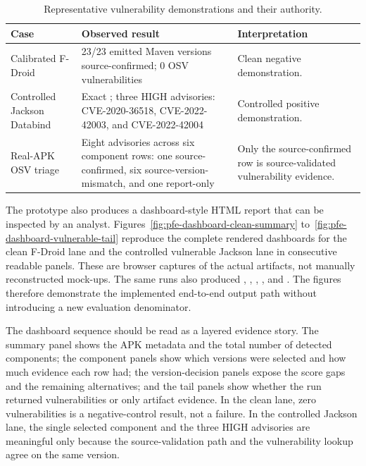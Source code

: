 \begin{table}[H]
\centering
\caption{Representative vulnerability demonstrations and their authority.}
\label{tab:pfe-vulnerability-demo}
\begin{tabularx}{\textwidth}{L{0.28\textwidth}L{0.26\textwidth}X}
\toprule
\textbf{Case} & \textbf{Observed result} & \textbf{Interpretation}\\
\midrule
Calibrated F-Droid & 23/23 emitted Maven versions source-confirmed; 0 OSV
vulnerabilities & Clean negative demonstration.\\
Controlled Jackson Databind & Exact
; three HIGH advisories:
CVE-2020-36518, CVE-2022-42003, and CVE-2022-42004 &
Controlled positive demonstration.\\
Real-APK OSV triage & Eight advisories across six component rows: one
source-confirmed, six source-version-mismatch, and one report-only &
Only the source-confirmed row is source-validated vulnerability evidence.\\
\bottomrule
\end{tabularx}
\end{table}

The prototype also produces a dashboard-style HTML report that can be inspected
by an analyst. Figures~\ref{fig:pfe-dashboard-clean-summary}
to~\ref{fig:pfe-dashboard-vulnerable-tail} reproduce the complete rendered
dashboards for the clean F-Droid lane and the controlled vulnerable Jackson
lane in consecutive readable panels. These are browser captures of the actual
 artifacts, not manually reconstructed mock-ups. The same
runs also produced , ,
, , and
. The figures therefore demonstrate the
implemented end-to-end output path without introducing a new evaluation
denominator.

The dashboard sequence should be read as a layered evidence story. The summary
panel shows the APK metadata and the total number of detected components; the
component panels show which versions were selected and how much evidence each
row had; the version-decision panels expose the score gaps and the remaining
alternatives; and the tail panels show whether the run returned vulnerabilities
or only artifact evidence. In the clean lane, zero vulnerabilities is a
negative-control result, not a failure. In the controlled Jackson lane, the
single selected component and the three HIGH advisories are meaningful only
because the source-validation path and the vulnerability lookup agree on the
same version.


